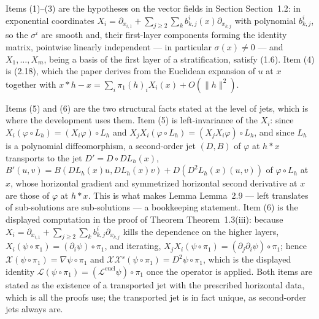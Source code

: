 \begin{definition}
Items (1)--(3) are the hypotheses on the vector fields in Section Section~1.2: in
exponential coordinates $X_i=\partial_{x_{i,1}}+\sum_{j\ge2}\sum_kb^i_{k,j}(x)\partial_{x_{k,j}}$
with polynomial $b^i_{k,j}$, so the $\sigma^i$ are smooth and, their first-layer components
forming the identity matrix, pointwise linearly independent --- in particular
$\sigma(x)\neq0$ --- and $X_1,\ldots,X_m$, being a basis of the first layer of a
stratification, satisfy (1.6). Item (4) is (2.18), which the paper derives from the
Euclidean expansion of $u$ at $x$ together with
$x*h-x=\sum_i\pi_1(h)_iX_i(x)+O(\|h\|^2)$.

Items (5) and (6) are the two structural facts stated at the level of jets, which is where
the development uses them. Item (5) is left-invariance of the $X_i$: since
$X_i(\varphi\circ L_h)=(X_i\varphi)\circ L_h$ and
$X_jX_i(\varphi\circ L_h)=(X_jX_i\varphi)\circ L_h$, and since $L_h$ is a polynomial
diffeomorphism, a second-order jet $(D,B)$ of $\varphi$ at $h*x$ transports to the jet
$D'=D\circ DL_h(x)$, $B'(u,v)=B(DL_h(x)u,DL_h(x)v)+D(D^2L_h(x)(u,v))$ of
$\varphi\circ L_h$ at $x$, whose horizontal gradient and symmetrized horizontal second
derivative at $x$ are those of $\varphi$ at $h*x$. This is what makes Lemma Lemma~2.9
--- left translates of sub-solutions are sub-solutions --- a bookkeeping statement. Item (6)
is the displayed computation in the proof of Theorem Theorem~1.3(iii): because
$X_i=\partial_{x_{i,1}}+\sum_{j\ge2}\sum_kb^i_{k,j}\partial_{x_{k,j}}$ kills the dependence
on the higher layers, $X_i(\psi\circ\pi_1)=(\partial_i\psi)\circ\pi_1$, and iterating,
$X_jX_i(\psi\circ\pi_1)=(\partial_j\partial_i\psi)\circ\pi_1$; hence
$\mathcal X(\psi\circ\pi_1)=\nabla\psi\circ\pi_1$ and
$\mathcal X\mathcal X^{s}(\psi\circ\pi_1)=D^2\psi\circ\pi_1$, which is the displayed
identity $\mathcal L(\psi\circ\pi_1)=(\mathcal L^{\mathrm{eucl}}\psi)\circ\pi_1$ once the
operator is applied. Both items are stated as the existence of a transported jet with the
prescribed horizontal data, which is all the proofs use; the transported jet is in fact
unique, as second-order jets always are.


\end{definition}
